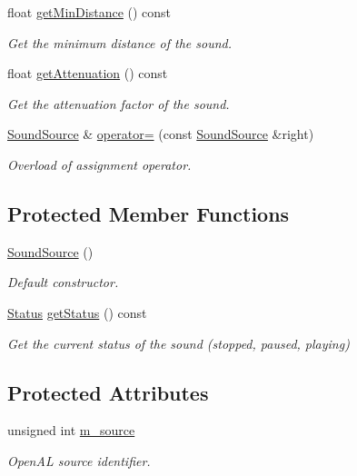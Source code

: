 \begin{DoxyCompactItemize}
float \hyperlink{classsf_1_1_sound_source_a605ca7f359ec1c36fcccdcd4696562ac}{get\+Min\+Distance} () const
\begin{DoxyCompactList}\small\item\em Get the minimum distance of the sound. \end{DoxyCompactList}\item 
float \hyperlink{classsf_1_1_sound_source_a8ad7dafb4f1b4afbc638cebe24f48cc9}{get\+Attenuation} () const
\begin{DoxyCompactList}\small\item\em Get the attenuation factor of the sound. \end{DoxyCompactList}\item 
\hyperlink{classsf_1_1_sound_source}{Sound\+Source} \& \hyperlink{classsf_1_1_sound_source_a355a07f34b5ecc38465d39a33b701b6d}{operator=} (const \hyperlink{classsf_1_1_sound_source}{Sound\+Source} \&right)
\begin{DoxyCompactList}\small\item\em Overload of assignment operator. \end{DoxyCompactList}\end{DoxyCompactItemize}
\subsection*{Protected Member Functions}
\begin{DoxyCompactItemize}
\item 
\hyperlink{classsf_1_1_sound_source_aefa4bd4460f387d81a0637d293979436}{Sound\+Source} ()
\begin{DoxyCompactList}\small\item\em Default constructor. \end{DoxyCompactList}\item 
\hyperlink{classsf_1_1_sound_source_ac43af72c98c077500b239bc75b812f03}{Status} \hyperlink{classsf_1_1_sound_source_a7e47072bd8b3982c708a6151f298d21a}{get\+Status} () const
\begin{DoxyCompactList}\small\item\em Get the current status of the sound (stopped, paused, playing) \end{DoxyCompactList}\end{DoxyCompactItemize}
\subsection*{Protected Attributes}
\begin{DoxyCompactItemize}
\item 
\mbox{\label{classsf_1_1_sound_source_a0223cef4b1c587e6e1e17b4c92c4479c}} 
unsigned int \hyperlink{classsf_1_1_sound_source_a0223cef4b1c587e6e1e17b4c92c4479c}{m\+\_\+source}
\begin{DoxyCompactList}\small\item\em Open\+AL source identifier. \end{DoxyCompactList}\end{DoxyCompactItemize}


